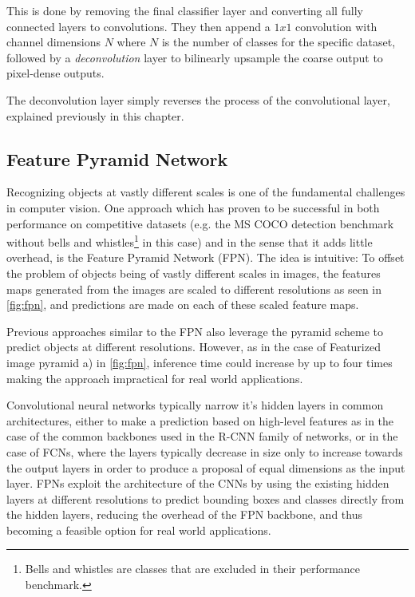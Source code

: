 \documentclass[oneside, english, bibtex]{kththesis}
\begin{document}
This is done by removing the final classifier layer and converting all fully connected layers to convolutions. They then append a $ 1 x 1$ convolution with channel dimensions $N$ where $N$ is the number of classes for the specific dataset, followed by a \textit{deconvolution} layer to bilinearly upsample the coarse output to pixel-dense outputs.

The deconvolution layer simply reverses the process of the convolutional layer, explained previously in this chapter.

\subsection{Feature Pyramid Network}

Recognizing objects at vastly different scales is one of the fundamental challenges in computer vision. One approach which has proven to be successful in both performance on competitive datasets (e.g. the MS COCO detection benchmark without bells and whistles\footnote{Bells and whistles are classes that are excluded in their performance benchmark.} in this case) and in the sense that it adds little overhead, is the Feature Pyramid Network (FPN). The idea is intuitive: To offset the problem of objects being of vastly different scales in images, the features maps generated from the images are scaled to different resolutions as seen in \autoref{fig:fpn}, and predictions are made on each of these scaled feature maps.

Previous approaches similar to the FPN also leverage the pyramid scheme to predict objects at different resolutions. However, as in the case of Featurized image pyramid a) in \autoref{fig:fpn}, inference time could increase by up to four times making the approach impractical for real world applications.

Convolutional neural networks typically narrow it’s hidden layers in common architectures, either to make a prediction based on high-level features as in the case of the common backbones used in the R-CNN family of networks, or in the case of FCNs, where the layers typically decrease in size only to increase towards the output layers in order to produce a proposal of equal dimensions as the input layer. FPNs exploit the architecture of the CNNs by using the existing hidden layers at different resolutions to predict bounding boxes and classes directly from the hidden layers, reducing the overhead of the FPN backbone, and thus becoming a feasible option for real world applications.
\end{document}
